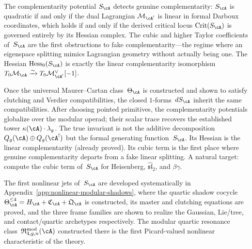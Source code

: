 \begin{remark}
\label{rem:fake-complementarity}
The complementarity potential $S_\cA$ detects genuine
complementarity: $S_\cA$ is quadratic if and only if the
dual Lagrangian $\mathcal{M}_{\cA^!}$ is linear in
formal Darboux coordinates, which holds if and only if the
derived critical locus $\mathrm{Crit}(S_\cA)$ is governed
entirely by its Hessian complex.  The cubic and higher Taylor
coefficients of~$S_\cA$ are the first obstructions to fake
complementarity---the regime where an eigenspace splitting
mimics Lagrangian geometry without actually being one.  The
Hessian $\mathrm{Hess}_0(S_\cA)$ is exactly the linear
complementarity isomorphism
$T_0\mathcal{M}_\cA \xrightarrow{\sim}
T_0\mathcal{M}_{\cA^!}^\vee[-1]$.
\end{remark}

\begin{remark}
\label{rem:complementarity-potential-modular}
Once the universal Maurer--Cartan class~$\Theta_\cA$ is
constructed and shown to satisfy clutching and Verdier
compatibilities, the closed $1$-forms~$dS_\cA$ inherit
the same compatibilities.  After choosing pointed
primitives, the complementarity potentials globalize over
the modular operad; their scalar trace recovers the
established tower
$\kappa(\cA) \cdot \lambda_g$.  The true invariant is not
the additive decomposition
$Q_g(\cA) \oplus Q_g(\cA^!)$ but the formal generating
function~$S_\cA$.  Its Hessian is the linear
complementarity (already proved).  Its cubic term is the
first place where genuine complementarity departs from a
fake linear splitting.  A natural target: compute the
cubic term of~$S_\cA$ for Heisenberg,
$\widehat{\mathfrak{sl}}_2$, and $\beta\gamma$.
\end{remark}

\begin{remark}
\label{rem:nonlinear-shadow-pointer}
The first nonlinear jets of~$S_\cA$ are developed systematically
in Appendix~\ref{app:nonlinear-modular-shadows}, where the quartic
shadow cocycle
$\Theta_\cA^{\le 4} = H_\cA + \mathfrak C_\cA + \mathfrak Q_\cA$
is constructed, its master and clutching equations are proved,
and the three frame families are shown to realize the Gaussian,
Lie/tree, and contact/quartic archetypes respectively.
The modular quartic resonance class~$\mathfrak R_{4,g,n}^{\mathrm{mod}}(\cA)$
constructed there is the first Picard-valued nonlinear characteristic of the theory.
\end{remark}

